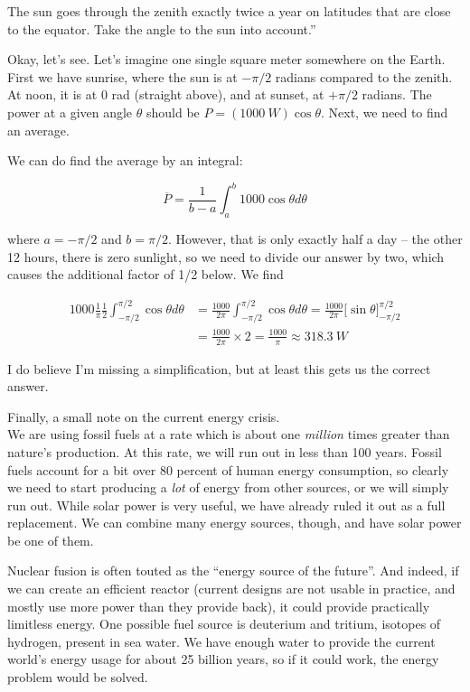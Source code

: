 The sun goes through the zenith exactly twice a year on latitudes that are close to the equator. Take the angle to the sun into account.''

Okay, let's see. Let's imagine one single square meter somewhere on the Earth. First we have sunrise, where the sun is at $-\pi/2$ radians compared to the zenith. At noon, it is at 0 rad (straight above), and at sunset, at $+\pi/2$ radians. The power at a given angle $\theta$ should be $P = (\SI{1000}{W})\cos\theta$. Next, we need to find an average.

We can do find the average by an integral:

\begin{equation}
\overbar{P} = \frac{1}{b - a} \int_a^b 1000 \cos \theta d \theta
\end{equation}

where $a = -\pi/2$ and $b = \pi/2$. However, that is only exactly half a day -- the other 12 hours, there is zero sunlight, so we need to divide our answer by two, which causes the additional factor of 1/2 below. We find

\begin{align}
1000 \frac{1}{\pi} \frac{1}{2} \int_{-\pi/2}^{\pi/2} \cos \theta d \theta &= \frac{1000}{2 \pi} \int_{-\pi/2}^{\pi/2} \cos \theta d \theta = \frac{1000}{2\pi} \Big[ \sin \theta \Big]_{-\pi/2}^{\pi/2}\\
                                                              &= \frac{1000}{2\pi} \times 2 = \frac{1000}{\pi} \approx \SI{318.3}{W}
\end{align}

I do believe I'm missing a simplification, but at least this gets us the correct answer.

Finally, a small note on the current energy crisis.\\
We are using fossil fuels at a rate which is about one \emph{million} times greater than nature's production. At this rate, we will run out in less than 100 years. Fossil fuels account for a bit over 80 percent of human energy consumption, so clearly we need to start producing a \emph{lot} of energy from other sources, or we will simply run out. While solar power is very useful, we have already ruled it out as a full replacement. We can combine many energy sources, though, and have solar power be one of them.

Nuclear fusion is often touted as the ``energy source of the future''. And indeed, if we can create an efficient reactor (current designs are not usable in practice, and mostly use more power than they provide back), it could provide practically limitless energy. One possible fuel source is deuterium and tritium, isotopes of hydrogen, present in sea water. We have enough water to provide the current world's energy usage for about 25 billion years, so if it could work, the energy problem would be solved.

